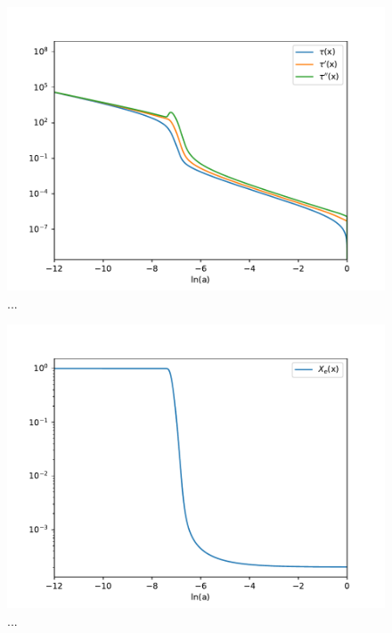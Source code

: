 \documentclass{aa}
\begin{document}
\begin{figure}[h!]
   \includegraphics[scale=0.5]{Figures/M2_tautilde.pdf}
   \caption{...}\label{fig:M2_tautilde}
\end{figure}

\begin{figure}[h!]
   \includegraphics[scale=0.5]{Figures/M2_Xe.pdf}
   \caption{...}\label{fig:M2_Xe}
\end{figure}
\end{document}
